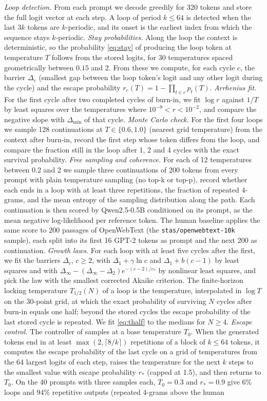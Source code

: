 \emph{Loop detection.} From each prompt we decode greedily for 320 tokens and store the full logit vector at each step. A loop of period $k\le64$ is detected when the last $3k$ tokens are $k$-periodic, and its onset is the earliest index from which the sequence stays $k$-periodic. \emph{Stay probabilities.} Along the loop the context is deterministic, so the probability \eqref{eq:stay} of producing the loop token at temperature $T$ follows from the stored logits, for 30 temperatures spaced geometrically between $0.15$ and $2$. From these we compute, for each cycle $c$, the barrier $\Delta_c$ (smallest gap between the loop token's logit and any other logit during the cycle) and the escape probability $r_c(T)=1-\prod_{t\in c}p_t(T)$. \emph{Arrhenius fit.} For the first cycle after two completed cycles of burn-in, we fit $\log r$ against $1/T$ by least squares over the temperatures where $10^{-9}<r<10^{-2}$, and compare the negative slope with $\Delta_{\min}$ of that cycle. \emph{Monte Carlo check.} For the first four loops we sample 128 continuations at $T\in\{0.6,1.0\}$ (nearest grid temperature) from the context after burn-in, record the first step whose token differs from the loop, and compare the fraction still in the loop after 1, 2 and 4 cycles with the exact survival probability. \emph{Free sampling and coherence.} For each of 12 temperatures between 0.2 and 2 we sample three continuations of 200 tokens from every prompt with plain temperature sampling (no top-k or top-p), record whether each ends in a loop with at least three repetitions, the fraction of repeated 4-grams, and the mean entropy of the sampling distribution along the path. Each continuation is then scored by Qwen2.5-0.5B \citep{qwen2025qwen25} conditioned on its prompt, as the mean negative log-likelihood per reference token. The human baseline applies the same score to 200 passages of OpenWebText (the \texttt{stas/openwebtext-10k} sample), each split into its first 16 GPT-2 tokens as prompt and the next 200 as continuation. \emph{Growth laws.} For each loop with at least five cycles after the first, we fit the barriers $\Delta_c$, $c\ge2$, with $\Delta_1+\gamma\ln c$ and $\Delta_1+b(c-1)$ by least squares and with $\Delta_\infty-(\Delta_\infty-\Delta_2)e^{-(c-2)/c_\ast}$ by nonlinear least squares, and pick the law with the smallest corrected Akaike criterion. The finite-horizon locking temperature $T_{1/2}(N)$ of a loop is the temperature, interpolated in $\log T$ on the 30-point grid, at which the exact probability of surviving $N$ cycles after burn-in equals one half; beyond the stored cycles the escape probability of the last stored cycle is repeated. We fit \eqref{eq:thalf} to the medians for $N\ge4$. \emph{Escape control.} The controller of  samples at a base temperature $T_0$. When the generated tokens end in at least $\max(2,\lceil 8/k\rceil)$ repetitions of a block of $k\le64$ tokens, it computes the escape probability of the last cycle on a grid of temperatures from the 64 largest logits of each step, raises the temperature for the next $k$ steps to the smallest value with escape probability $r_\ast$ (capped at 1.5), and then returns to $T_0$. On the 40 prompts with three samples each, $T_0=0.3$ and $r_\ast=0.9$ give 6\% loops and 94\% repetitive outputs (repeated 4-grams above the human 